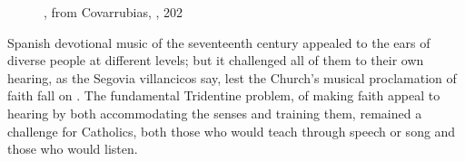 \begin{figure}
    \caption{, from
    Covarrubias, , 202}

    \label{fig:Covarrubias-Emblemas-202-ears-thorns}
\end{figure}

Spanish devotional music of the seventeenth century appealed to the ears of
diverse people at different levels; but it challenged all of them to
 their own hearing, as the Segovia villancicos say, lest the
Church's musical proclamation of faith fall on .
The fundamental Tridentine problem, of making faith appeal to hearing by both
accommodating the senses and training them, remained a challenge for Catholics,
both those who would teach through speech or song and those who would listen.


\endinput
